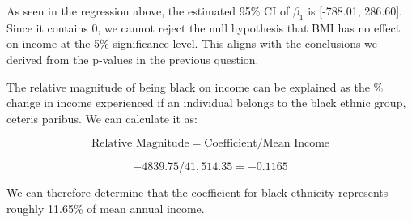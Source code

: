 
As seen in the regression above, the estimated 95\% CI of $\beta_1$ is [-788.01, 286.60]. Since it contains 0, we cannot reject the null hypothesis that BMI has no effect on income at the 5\% significance level. This aligns with the conclusions we derived from the p-values in the previous question.


The relative magnitude of being black on income can be explained as the \% change in income experienced if an individual belongs to the black ethnic group, ceteris paribus. We can calculate it as:

\vspace{-1em}

\begin{equation}
       \text{Relative Magnitude} = \text{Coefficient} / \text{Mean Income}
\end{equation}

\vspace{-1em}

\begin{equation}
       -4839.75 / 41,514.35 = -0.1165
\end{equation}

We can therefore determine that the coefficient for black ethnicity represents roughly 11.65\% of mean annual income.